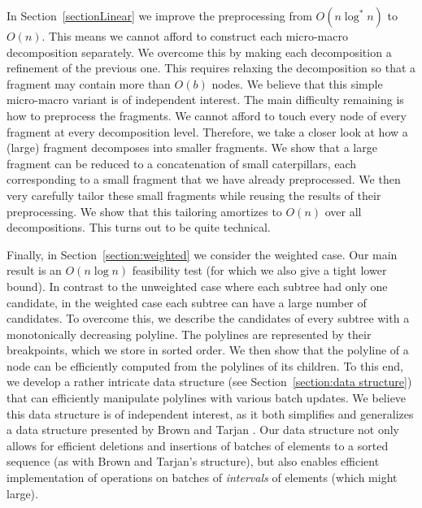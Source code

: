 \documentclass[11pt,a4paper]{article}
\theoremstyle{definition}
\theoremstyle{remark}
\begin{document}
In Section~\ref{sectionLinear} we improve the preprocessing from $O(n\log^* n)$ to $O(n)$. This means we cannot afford to construct each micro-macro decomposition separately. We overcome this by making each decomposition a refinement of the previous one. This requires relaxing the decomposition so that a fragment may contain more than $O(b)$ nodes. 
We believe that this simple micro-macro variant is of independent interest. 
%
The main difficulty remaining is how to preprocess the fragments. We cannot afford to touch every node of every fragment at every decomposition level. Therefore, we take a closer look at how a (large) fragment decomposes into smaller fragments. 
We show that a large fragment can be reduced to a concatenation of small caterpillars, each corresponding to a small fragment that we have already preprocessed. We then very carefully tailor these small fragments while reusing the results of their preprocessing. We show that this tailoring amortizes to $O(n)$ over all decompositions. This turns out to be quite technical. 

Finally, in Section~\ref{section:weighted} we consider the weighted case. Our main result  is an  $O(n\log n)$ feasibility test (for which we also give a tight lower bound). In contrast to the unweighted case where each subtree had only one candidate, in the weighted case each subtree can have a large number of candidates. To overcome this, we describe the candidates of every subtree with a monotonically decreasing polyline. The polylines are represented by their breakpoints, which we store in sorted order. We then show that the polyline of a node can be efficiently computed from the polylines of its children. To this end, we develop a rather intricate data structure (see Section~\ref{section:data structure}) that can efficiently manipulate polylines with various batch updates. We believe this data structure is of independent interest, as it both simplifies and generalizes a data structure presented by Brown and Tarjan \cite{Brown1980a}. Our data structure not only allows for efficient deletions and insertions of batches of elements to a sorted sequence (as with Brown and Tarjan's structure), but also enables efficient implementation of operations on batches of \emph{intervals} of elements (which might large).
\end{document}
